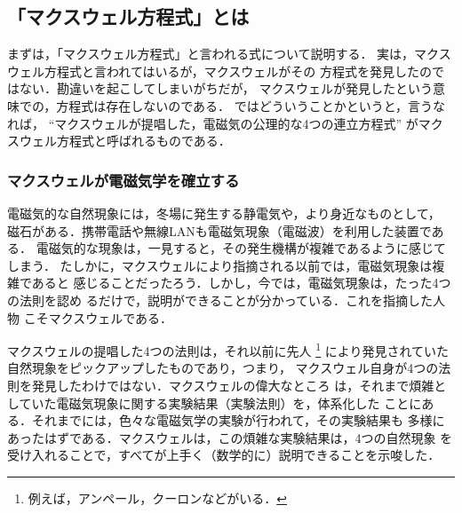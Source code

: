        \subsection{「マクスウェル方程式」とは}
        \begin{mycomment}
            まずは，「マクスウェル方程式」と言われる式について説明する．
            実は，マクスウェル方程式と言われてはいるが，マクスウェルがその
            方程式を発見したのではない．勘違いを起こしてしまいがちだが，
            マクスウェルが発見したという意味での，方程式は存在しないのである．
            ではどういうことかというと，言うなれば，
               “マクスウェルが提唱した，電磁気の公理的な4つの連立方程式”
            がマクスウェル方程式と呼ばれるものである．
        \end{mycomment}

            \subsubsection{マクスウェルが電磁気学を確立する}
            電磁気的な自然現象には，冬場に発生する静電気や，より身近なものとして，
            磁石がある．携帯電話や無線LANも電磁気現象（電磁波）を利用した装置である．
            電磁気的な現象は，一見すると，その発生機構が複雑であるように感じてしまう．
            たしかに，マクスウェルにより指摘される以前では，電磁気現象は複雑であると
            感じることだったろう．しかし，今では，電磁気現象は，たった4つの法則を認め
            るだけで，説明ができることが分かっている．これを指摘した人物
            こそマクスウェルである．

            マクスウェルの提唱した4つの法則は，それ以前に先人
                \footnote{
                    例えば，アンペール，クーロンなどがいる．
                }
            により発見されていた自然現象をピックアップしたものであり，つまり，
            マクスウェル自身が4つの法則を発見したわけではない．マクスウェルの偉大なところ
            は，それまで煩雑としていた電磁気現象に関する実験結果（実験法則）を，体系化した
            ことにある．それまでには，色々な電磁気学の実験が行われて，その実験結果も
            多様にあったはずである．マクスウェルは，この煩雑な実験結果は，4つの自然現象
            を受け入れることで，すべてが上手く（数学的に）説明できることを示唆した．

